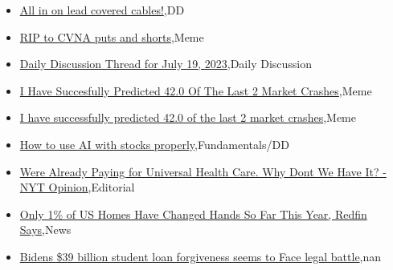 \documentclass{article}%
\begin{document}
%
\begin{itemize}%
\item%
\href{https://reddit.com/r/wallstreetbets/comments/153si5r/all\_in\_on\_lead\_covered\_cables/}{All in on lead covered cables!},DD%
\item%
\href{https://reddit.com/r/wallstreetbets/comments/153rm3v/rip\_to\_cvna\_puts\_and\_shorts/}{RIP to CVNA puts and shorts},Meme%
\item%
\href{https://reddit.com/r/wallstreetbets/comments/153qn2p/daily\_discussion\_thread\_for\_july\_19\_2023/}{Daily Discussion Thread for July 19, 2023},Daily Discussion%
\item%
\href{https://reddit.com/r/wallstreetbets/comments/153nmob/i\_have\_succesfully\_predicted\_420\_of\_the\_last\_2/}{I Have Succesfully Predicted 42.0 Of The Last 2 Market Crashes},Meme%
\item%
\href{https://reddit.com/r/StockMarket/comments/153npwj/i\_have\_successfully\_predicted\_420\_of\_the\_last\_2/}{I have successfully predicted 42.0 of the last 2 market crashes},Meme%
\item%
\href{https://reddit.com/r/StockMarket/comments/153l6nb/how\_to\_use\_ai\_with\_stocks\_properly/}{How to use AI with stocks properly},Fundamentals/DD%
\item%
\href{https://reddit.com/r/Economics/comments/153cv3p/were\_already\_paying\_for\_universal\_health\_care\_why/}{Were Already Paying for Universal Health Care. Why Dont We Have It? - NYT Opinion},Editorial%
\item%
\href{https://reddit.com/r/Economics/comments/153cbg9/only\_1\_of\_us\_homes\_have\_changed\_hands\_so\_far\_this/}{Only 1\% of US Homes Have Changed Hands So Far This Year, Redfin Says},News%
\item%
\href{https://reddit.com/r/Economics/comments/153594b/bidens\_39\_billion\_student\_loan\_forgiveness\_seems/}{Bidens \$39 billion student loan forgiveness seems to Face legal battle},nan%
\end{itemize}%
\end{document}

